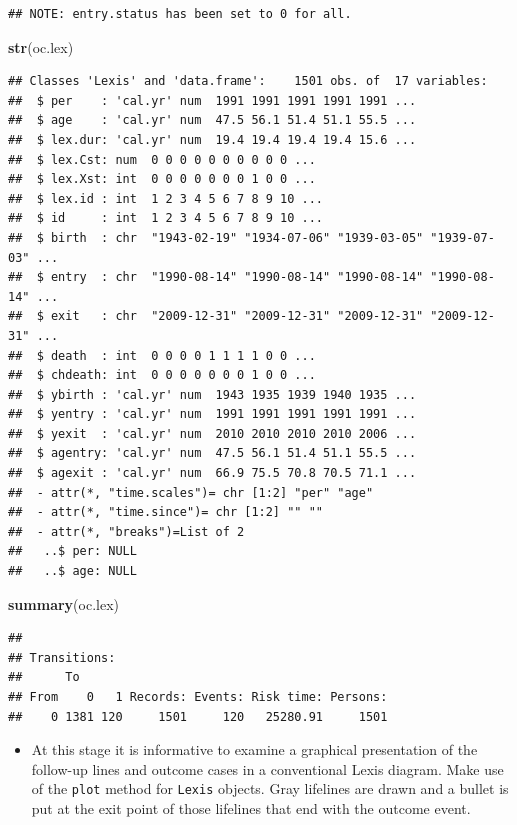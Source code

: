 \documentclass[
]{book}
\newenvironment{Shaded}{\begin{snugshade}}{\end{snugshade}}
\newcommand{\FunctionTok}[1]{\textcolor[rgb]{0.13,0.29,0.53}{\textbf{#1}}}
\newcommand{\NormalTok}[1]{#1}
\providecommand{\tightlist}{%
  \setlength{\itemsep}{0pt}\setlength{\parskip}{0pt}}
\begin{document}
\begin{verbatim}
## NOTE: entry.status has been set to 0 for all.
\end{verbatim}

\begin{Shaded}
\begin{Highlighting}[]
\FunctionTok{str}\NormalTok{(oc.lex)}
\end{Highlighting}
\end{Shaded}

\begin{verbatim}
## Classes 'Lexis' and 'data.frame':    1501 obs. of  17 variables:
##  $ per    : 'cal.yr' num  1991 1991 1991 1991 1991 ...
##  $ age    : 'cal.yr' num  47.5 56.1 51.4 51.1 55.5 ...
##  $ lex.dur: 'cal.yr' num  19.4 19.4 19.4 19.4 15.6 ...
##  $ lex.Cst: num  0 0 0 0 0 0 0 0 0 0 ...
##  $ lex.Xst: int  0 0 0 0 0 0 0 1 0 0 ...
##  $ lex.id : int  1 2 3 4 5 6 7 8 9 10 ...
##  $ id     : int  1 2 3 4 5 6 7 8 9 10 ...
##  $ birth  : chr  "1943-02-19" "1934-07-06" "1939-03-05" "1939-07-03" ...
##  $ entry  : chr  "1990-08-14" "1990-08-14" "1990-08-14" "1990-08-14" ...
##  $ exit   : chr  "2009-12-31" "2009-12-31" "2009-12-31" "2009-12-31" ...
##  $ death  : int  0 0 0 0 1 1 1 1 0 0 ...
##  $ chdeath: int  0 0 0 0 0 0 0 1 0 0 ...
##  $ ybirth : 'cal.yr' num  1943 1935 1939 1940 1935 ...
##  $ yentry : 'cal.yr' num  1991 1991 1991 1991 1991 ...
##  $ yexit  : 'cal.yr' num  2010 2010 2010 2010 2006 ...
##  $ agentry: 'cal.yr' num  47.5 56.1 51.4 51.1 55.5 ...
##  $ agexit : 'cal.yr' num  66.9 75.5 70.8 70.5 71.1 ...
##  - attr(*, "time.scales")= chr [1:2] "per" "age"
##  - attr(*, "time.since")= chr [1:2] "" ""
##  - attr(*, "breaks")=List of 2
##   ..$ per: NULL
##   ..$ age: NULL
\end{verbatim}

\begin{Shaded}
\begin{Highlighting}[]
\FunctionTok{summary}\NormalTok{(oc.lex)}
\end{Highlighting}
\end{Shaded}

\begin{verbatim}
##     
## Transitions:
##      To
## From    0   1 Records: Events: Risk time: Persons:
##    0 1381 120     1501     120   25280.91     1501
\end{verbatim}

\begin{itemize}
\tightlist
\item
  At this stage it is informative to examine a graphical
  presentation of the follow-up lines and outcome cases in a conventional
  Lexis diagram. Make use of the \texttt{plot} method for \texttt{Lexis} objects.
  Gray lifelines are drawn and a bullet is put at the exit point of those lifelines
  that end with the outcome event.
\end{itemize}
\end{document}
